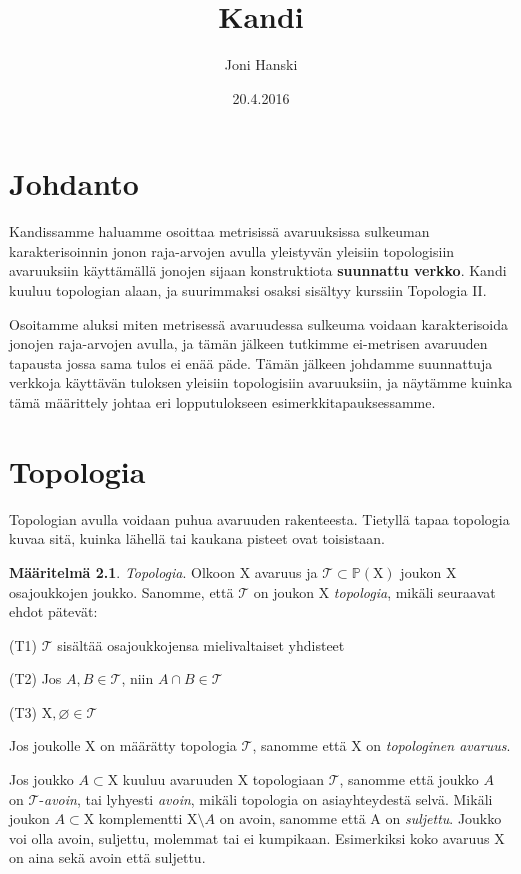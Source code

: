 \documentclass[12pt,a4paper,leqno]{report}
\title{Kandi}
\author{Joni Hanski}
\date{20.4.2016}
\newcommand{\X}{\mathrm{X}}
\newcommand{\Pow}{\mathbb{P}}
\newcommand{\T}{\mathcal{T}}
\theoremstyle{plain}
\theoremstyle{definition}
\newtheorem{maar}[equation]{Määritelmä}
\theoremstyle{remark}
\begin{document}
\maketitle

\tableofcontents

\chapter{Johdanto}\label{johd}

Kandissamme haluamme osoittaa metrisissä avaruuksissa sulkeuman karakterisoinnin jonon raja-arvojen avulla yleistyvän yleisiin topologisiin avaruuksiin käyttämällä jonojen sijaan konstruktiota \textbf{suunnattu verkko}. Kandi kuuluu topologian alaan, ja suurimmaksi osaksi sisältyy kurssiin Topologia II.

Osoitamme aluksi miten metrisessä avaruudessa sulkeuma voidaan karakterisoida jonojen raja-arvojen avulla, ja tämän jälkeen tutkimme ei-metrisen avaruuden tapausta jossa sama tulos ei enää päde. Tämän jälkeen johdamme suunnattuja verkkoja käyttävän tuloksen yleisiin topologisiin avaruuksiin, ja näytämme kuinka tämä määrittely johtaa eri lopputulokseen esimerkkitapauksessamme.

\chapter{Topologia}\label{TOP}

Topologian avulla voidaan puhua avaruuden rakenteesta. Tietyllä tapaa topologia kuvaa sitä, kuinka lähellä tai kaukana pisteet ovat toisistaan.

\begin{maar}\label{topmaar}
\emph{Topologia}. Olkoon $\X$ avaruus ja $\T \subset \Pow(\X)$ joukon $\X$ osajoukkojen joukko. Sanomme, että $\T$ on joukon $\X$ \emph{topologia}, mikäli seuraavat ehdot pätevät:

(T1) $\T$ sisältää osajoukkojensa mielivaltaiset yhdisteet

(T2) Jos $A,B \in \T$, niin $A \cap B \in \T$

(T3) $\X, \varnothing \in \T$
\end{maar}

Jos joukolle $\X$ on määrätty topologia $\T$, sanomme että $\X$ on \emph{topologinen avaruus}.

Jos joukko $A \subset \X$ kuuluu avaruuden $\X$ topologiaan $\T$, sanomme että joukko $A$ on $\T$-\emph{avoin}, tai lyhyesti \emph{avoin}, mikäli topologia on asiayhteydestä selvä. Mikäli joukon $A \subset \X$ komplementti $\X \setminus A$ on avoin, sanomme että A on \emph{suljettu}. Joukko voi olla avoin, suljettu, molemmat tai ei kumpikaan. Esimerkiksi koko avaruus $\X$ on aina sekä avoin että suljettu.
\end{document}
